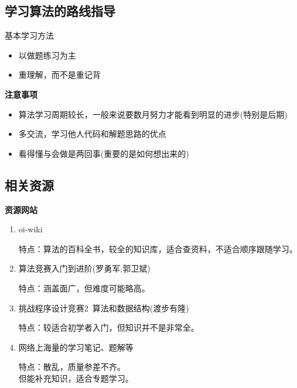 \documentclass{beamer}
\begin{document}
\subsection{学习算法的路线指导}
\begin{frame}
    \begin{block}{基本学习方法}
        \begin{itemize}
            \item 以做题练习为主
            \item 重理解，而不是重记背
        \end{itemize}
    \end{block}
    \large{\textbf{\color[RGB]{218, 76, 21}注意事项}}\\
    \begin{itemize}
        \item 算法学习周期较长，一般来说要数月努力才能看到明显的进步(特别是后期)
        \item 多交流，学习他人代码和解题思路的优点
        \item 看得懂与会做是两回事(重要的是如何想出来的)
    \end{itemize}
\end{frame}

\subsection{相关资源}
\begin{frame}
    \large{\textbf{\color[RGB]{34, 164, 241}资源网站}}\\
    \begin{enumerate}
        \item oi-wiki\par %
        特点：算法的百科全书，较全的知识库，适合查资料，不适合顺序跟随学习。
        \item 算法竞赛入门到进阶(罗勇军,郭卫斌)\par
        特点：涵盖面广，但难度可能略高。
        \item 挑战程序设计竞赛2\ 算法和数据结构(渡步有隆)\par %
        特点：较适合初学者入门，但知识并不是非常全。
        \item 网络上海量的学习笔记、题解等\par
        特点：散乱，质量参差不齐。\\但能补充知识，适合专题学习。
    \end{enumerate}
\end{frame}
\end{document}
